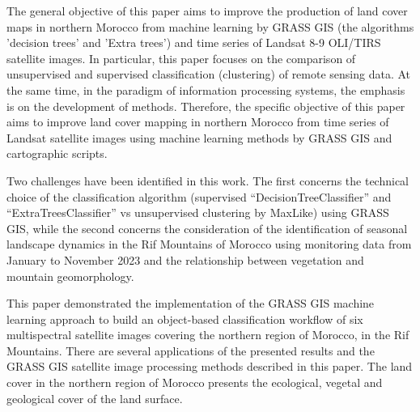 \documentclass[geomatics,article,submit,pdftex,moreauthors]{Definitions/mdpi}
\begin{document}
The general objective of this paper aims to improve the production of land cover maps in northern Morocco from machine learning by GRASS GIS (the algorithms 'decision trees' and 'Extra trees') and time series of Landsat 8-9 OLI/TIRS satellite images. In particular, this paper focuses on the comparison of unsupervised and supervised classification (clustering) of remote sensing data. At the same time, in the paradigm of information processing systems, the emphasis is on the development of methods. Therefore, the specific objective of this paper aims to improve land cover mapping in northern Morocco from time series of Landsat satellite images using machine learning methods by GRASS GIS and cartographic scripts.

Two challenges have been identified in this work. The first concerns the technical choice of the classification algorithm (supervised “DecisionTreeClassifier” and “ExtraTreesClassifier” vs unsupervised clustering by MaxLike) using GRASS GIS, while the second concerns the consideration of the identification of seasonal landscape dynamics in the Rif Mountains of Morocco using monitoring data from January to November 2023 and the relationship between vegetation and mountain geomorphology.

This paper demonstrated the implementation of the GRASS GIS machine learning approach to build an object-based classification workflow of six multispectral satellite images covering the northern region of Morocco, in the Rif Mountains. There are several applications of the presented results and the GRASS GIS satellite image processing methods described in this paper. The land cover in the northern region of Morocco presents the ecological, vegetal and geological cover of the land surface.




\end{document}
